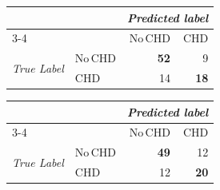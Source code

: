 \documentclass[12pt,a4paper]{article}
\begin{document}
\vspace{2pt}
\noindent
\begin{minipage}[t]{0.46\linewidth}
\centering
\captionsetup{width=\linewidth}
\label{tab:cm}
\vspace{2pt}
{\footnotesize
\renewcommand{\arraystretch}{1.1}
\begin{tabular}{@{}llrr@{}}
& & \multicolumn{2}{c}{\textit{Predicted label}} \\
\cmidrule(l){3-4}
& & No\,CHD & CHD \\
\midrule
\multirow{2}{*}{\textit{True Label}} & No\,CHD & \textbf{52} & 9  \\
                                     & CHD     & 14          & \textbf{18} \\
\bottomrule
\end{tabular}}
\end{minipage}\hfill
\begin{minipage}[t]{0.46\linewidth}
\centering
\captionsetup{width=\linewidth}
\label{tab:oc_cm}
\vspace{2pt}
{\footnotesize
\renewcommand{\arraystretch}{1.1}
\begin{tabular}{@{}llrr@{}}
& & \multicolumn{2}{c}{\textit{Predicted label}} \\
\cmidrule(l){3-4}
& & No\,CHD & CHD \\
\midrule
\multirow{2}{*}{\textit{True Label}} & No\,CHD & \textbf{49} & 12 \\
                                     & CHD     & 12          & \textbf{20} \\
\bottomrule
\end{tabular}}
\end{minipage}
\end{document}
